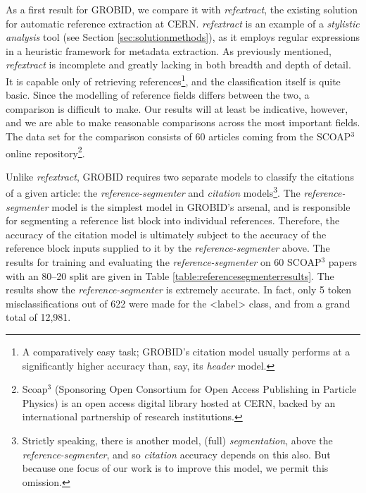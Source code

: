 As a first result for GROBID, we compare it with \emph{refextract}, the existing solution for automatic reference extraction at CERN. \emph{refextract} is an example of a \emph{stylistic analysis} tool (see Section \ref{sec:solutionmethods}), as it employs regular expressions in a heuristic framework for metadata extraction. As previously mentioned, \emph{refextract} is incomplete and greatly lacking in both breadth and depth of detail. It is capable only of retrieving references\footnote{A comparatively easy task; GROBID's citation model usually performs at a significantly higher accuracy than, say, its \emph{header} model.}, and the classification itself is quite basic. Since the modelling of reference fields differs between the two, a comparison is difficult to make. Our results will at least be indicative, however, and we are able to make reasonable comparisons across the most important fields. The data set for the comparison consists of 60 articles coming from the SCOAP$^3$ online repository\footnote{Scoap$^3$ (Sponsoring Open Consortium for Open Access Publishing in Particle Physics) is an open access digital library hosted at CERN, backed by an international partnership of research institutions.}.

Unlike \emph{refextract}, GROBID requires two separate models to classify the citations of a given article: the \emph{reference-segmenter} and \emph{citation} models\footnote{Strictly speaking, there is another model, (full) \emph{segmentation}, above the \emph{reference-segmenter}, and so \emph{citation} accuracy depends on this also. But because one focus of our work is to improve this model, we permit this omission.}. The \emph{reference-segmenter} model is the simplest model in GROBID's arsenal, and is responsible for segmenting a reference list block into individual references. Therefore, the accuracy of the citation model is ultimately subject to the accuracy of the reference block inputs supplied to it by the \emph{reference-segmenter} above. The results for training and evaluating the \emph{reference-segmenter} on 60 SCOAP$^3$ papers with an 80--20 split are given in Table \ref{table:referencesegmenterresults}. The results show the \emph{reference-segmenter} is extremely accurate. In fact, only 5 token misclassifications out of 622 were made for the <label> class, and from a grand total of 12,981.

